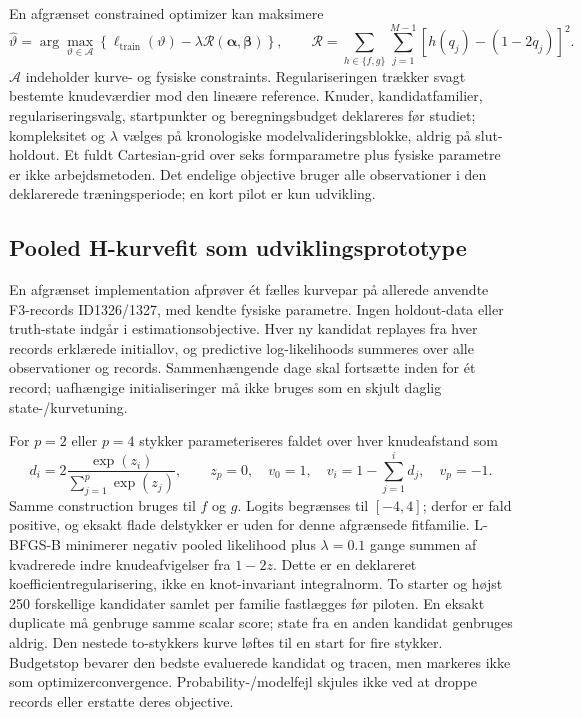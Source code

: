 En afgrænset constrained optimizer kan maksimere
\begin{equation}
 \widehat\vartheta=\arg\max_{\vartheta\in\mathcal A}
 \left\{\ell_{\mathrm{train}}(\vartheta)
          -\lambda\mathcal R(\bm\alpha,\bm\beta)\right\},\qquad
 \mathcal R=\sum_{h\in\{f,g\}}\sum_{j=1}^{M-1}
       [h(q_j)-(1-2q_j)]^2.
 \label{eq:shared_response_fit}
\end{equation}
\(\mathcal A\) indeholder kurve- og fysiske constraints. Regulariseringen trækker
svagt bestemte knudeværdier mod den lineære reference. Knuder, kandidatfamilier,
regulariseringsvalg, startpunkter og beregningsbudget deklareres før studiet;
kompleksitet og \(\lambda\) vælges på kronologiske modelvalideringsblokke, aldrig
på slut-holdout. Et fuldt Cartesian-grid over seks formparametre plus fysiske
parametre er ikke arbejdsmetoden. Det endelige objective bruger alle observationer
i den deklarerede træningsperiode; en kort pilot er kun udvikling.

\subsection{Pooled H-kurvefit som udviklingsprototype}
En afgrænset implementation afprøver ét fælles kurvepar på allerede anvendte
F3-records ID1326/1327, med kendte fysiske parametre. Ingen holdout-data eller
truth-state indgår i estimationsobjective. Hver ny kandidat replayes fra hver
records erklærede initiallov, og predictive log-likelihoods summeres over alle
observationer og records. Sammenhængende dage skal fortsætte inden for ét record;
uafhængige initialiseringer må ikke bruges som en skjult daglig state-/kurvetuning.

For $p=2$ eller $p=4$ stykker parameteriseres faldet over hver knudeafstand som
\[
 d_i=2\frac{\exp(z_i)}{\sum_{j=1}^p\exp(z_j)},\qquad z_p=0,
 \quad v_0=1,\quad v_i=1-\sum_{j=1}^i d_j,\quad v_p=-1.
\]
Samme construction bruges til $f$ og $g$. Logits begrænses til $[-4,4]$; derfor
er fald positive, og eksakt flade delstykker er uden for denne afgrænsede fitfamilie.
L-BFGS-B minimerer negativ pooled likelihood plus $\lambda=0.1$ gange summen
af kvadrerede indre knudeafvigelser fra $1-2z$. Dette er en deklareret
koefficientregularisering, ikke en knot-invariant integralnorm.
To starter og højst 250 forskellige kandidater samlet per familie fastlægges
før piloten. En eksakt duplicate må genbruge samme scalar score; state fra en
anden kandidat genbruges aldrig. Den nestede to-stykkers kurve løftes til en
start for fire stykker. Budgetstop bevarer den bedste evaluerede kandidat og
tracen, men markeres ikke som optimizerconvergence. Probability-/modelfejl
skjules ikke ved at droppe records eller erstatte deres objective.

